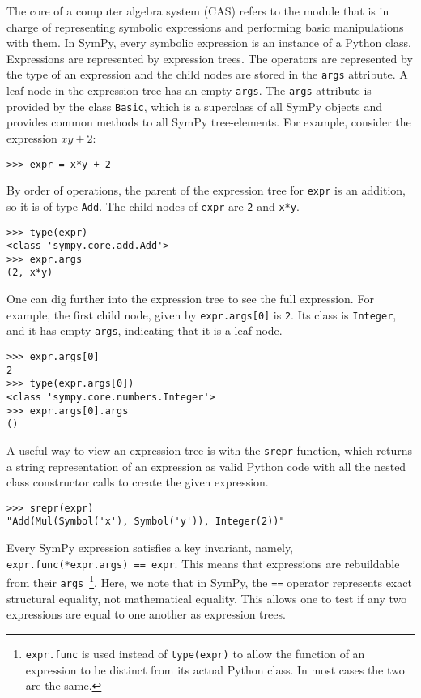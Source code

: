 The core of a computer algebra system (CAS) refers to the module that is in
charge of representing symbolic expressions and performing basic manipulations
with them. In SymPy, every symbolic expression is an instance of a Python class.
Expressions are represented by expression trees. The operators are represented
by the type of an expression and the child nodes are stored in the
\texttt{args} attribute. A leaf node in the expression tree has an empty
\texttt{args}.
The \texttt{args} attribute is provided by the class \texttt{Basic},
which is a superclass of all SymPy objects and
provides common methods to all SymPy tree-elements.
For example, consider the expression $xy + 2$:
\begin{verbatim}
>>> expr = x*y + 2
\end{verbatim}
By order of operations, the parent of the expression tree for \texttt{expr} is
an addition, so it is of type \texttt{Add}. The child nodes of \texttt{expr} are
\texttt{2} and \texttt{x*y}.
\begin{verbatim}
>>> type(expr)
<class 'sympy.core.add.Add'>
>>> expr.args
(2, x*y)
\end{verbatim}

One can dig further into the expression tree to see the full expression. For
example, the first child node, given by \texttt{expr.args[0]} is
\texttt{2}. Its class is \texttt{Integer}, and it has empty \texttt{args},
indicating that it is a leaf node.
\begin{verbatim}
>>> expr.args[0]
2
>>> type(expr.args[0])
<class 'sympy.core.numbers.Integer'>
>>> expr.args[0].args
()
\end{verbatim}

A useful way to view an expression tree is with the \texttt{srepr} function,
which returns a string representation of an expression as valid Python code
with all the nested class constructor calls to create the given expression.
\begin{verbatim}
>>> srepr(expr)
"Add(Mul(Symbol('x'), Symbol('y')), Integer(2))"
\end{verbatim}

Every SymPy expression satisfies a key invariant, namely,
\texttt{expr.func(*expr.args) == expr}. This means that expressions are
rebuildable from their \texttt{args}~\footnote{\texttt{expr.func} is used
instead of \texttt{type(expr)} to allow the function of an expression to be
distinct from its actual Python class. In most cases the two are the same.}.
Here, we note that in SymPy, the \texttt{==} operator represents exact
structural equality, not mathematical equality. This allows one to test if
any two expressions are equal to one another as expression trees.

